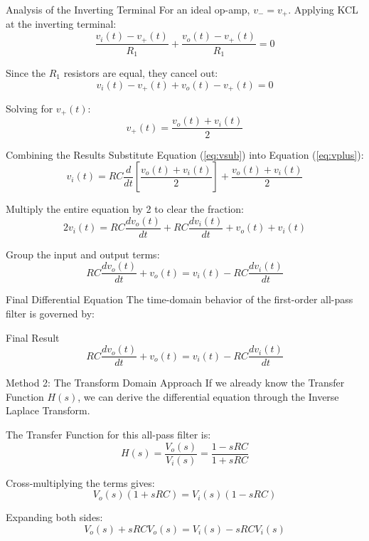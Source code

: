 \documentclass{beamer}
\begin{document}
\begin{frame}{Analysis of the Inverting Terminal}
    For an ideal op-amp, $v_- = v_+$. Applying KCL at the inverting terminal:
    $$\frac{v_i(t) - v_+(t)}{R_1} + \frac{v_o(t) - v_+(t)}{R_1} = 0$$
    \par\vspace{0.3cm}
    Since the $R_1$ resistors are equal, they cancel out:
    $$v_i(t) - v_+(t) + v_o(t) - v_+(t) = 0$$
    \par\vspace{0.3cm}
    Solving for $v_+(t)$:
    \begin{equation}
        v_+(t) = \frac{v_o(t) + v_i(t)}{2} \label{eq:vsub}
    \end{equation}
\end{frame}
\begin{frame}{Combining the Results}
    Substitute Equation (\ref{eq:vsub}) into Equation (\ref{eq:vplus}):
    $$v_i(t) = RC \frac{d}{dt} \left[ \frac{v_o(t) + v_i(t)}{2} \right] + \frac{v_o(t) + v_i(t)}{2}$$
    \par\vspace{0.3cm}
    Multiply the entire equation by 2 to clear the fraction:
    $$2v_i(t) = RC \frac{dv_o(t)}{dt} + RC \frac{dv_i(t)}{dt} + v_o(t) + v_i(t)$$
    \par\vspace{0.3cm}
    Group the input and output terms:
    $$RC \frac{dv_o(t)}{dt} + v_o(t) = v_i(t) - RC \frac{dv_i(t)}{dt}$$
\end{frame}


\begin{frame}{Final Differential Equation}
    The time-domain behavior of the first-order all-pass filter is governed by:
    \vfill
    \begin{block}{Final Result}
        $$RC \frac{dv_o(t)}{dt} + v_o(t) = v_i(t) - RC \frac{dv_i(t)}{dt}$$
    \end{block}
   
\end{frame}

\begin{frame}{Method 2: The Transform Domain Approach}
    If we already know the Transfer Function $H(s)$, we can derive the differential equation through the Inverse Laplace Transform.
    \par\vspace{0.3cm}
    The Transfer Function for this all-pass filter is:
    $$H(s) = \frac{V_o(s)}{V_i(s)} = \frac{1 - sRC}{1 + sRC}$$
    \par\vspace{0.3cm}
    Cross-multiplying the terms gives:
    $$V_o(s)(1 + sRC) = V_i(s)(1 - sRC)$$
    \par\vspace{0.3cm}
    Expanding both sides:
    $$V_o(s) + sRC V_o(s) = V_i(s) - sRC V_i(s)$$
\end{frame}
\end{document}
